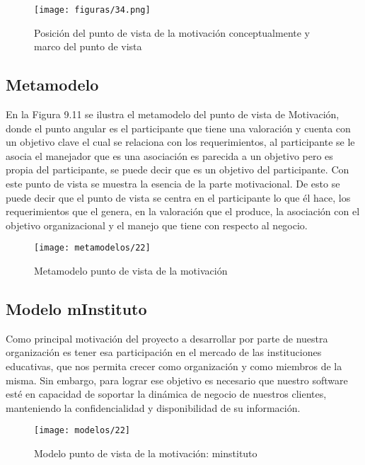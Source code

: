    \begin{figure}[H]
   	\centering
   	\texttt{[image: figuras/34.png]}
   	\captionsetup{width=.95\textwidth}
   	\caption{Posición del punto de vista de la motivación conceptualmente y marco del punto de vista}
   	\label{figura34}
   \end{figure}
   
   \subsection{Metamodelo}
   En la Figura 9.11 se ilustra el metamodelo del punto de vista de Motivación, donde el punto angular es el participante que tiene una valoración y cuenta con un objetivo clave el cual se relaciona con los requerimientos, al participante se le asocia el manejador que es una asociación es parecida a un objetivo pero es propia del participante, se puede decir que es un objetivo del participante. Con este punto de vista se muestra la esencia de la parte motivacional. De esto se puede decir que el punto de vista se centra en el participante lo que él hace, los requerimientos que el genera, en la valoración que el produce, la asociación con el objetivo organizacional y el manejo que tiene con respecto al negocio.
   
   \begin{figure}[H]
   	\centering
   	\texttt{[image: metamodelos/22]}
   	\captionsetup{width=.95\textwidth}
   	\caption{Metamodelo punto de vista de la motivación}
   	\label{metamodelo22}
   \end{figure}
   
   \subsection{Modelo mInstituto}
   Como principal motivación del proyecto a desarrollar por parte de nuestra organización es tener esa participación en el mercado de las instituciones educativas, que nos permita crecer como organización y como miembros de la misma. Sin embargo, para lograr ese objetivo es necesario que nuestro software esté en capacidad de soportar la dinámica de negocio de nuestros clientes, manteniendo la confidencialidad y disponibilidad de su información.
   
   \begin{figure}[H]
   	\centering
   	\texttt{[image: modelos/22]}
   	\captionsetup{width=.95\textwidth}
   	\caption{Modelo punto de vista de la motivación: minstituto}
   	\label{modelo22}
   \end{figure}